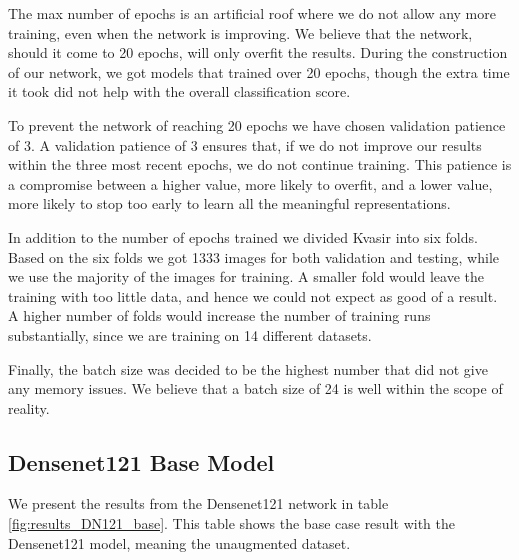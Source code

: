 The max number of epochs is an artificial roof where we do not allow any more training, even when the network is improving.  We believe that the network, should it come to 20 epochs, will only overfit the results. During the construction of our network, we got models that trained over 20 epochs, though the extra time it took did not help with the overall classification score.

To prevent the network of reaching 20 epochs we have chosen validation patience of 3. A validation patience of 3 ensures that, if we do not improve our results within the three most recent epochs, we do not continue training.  This patience is a compromise between a higher value, more likely to overfit, and a lower value, more likely to stop too early to learn all the meaningful representations. 

In addition to the number of epochs trained we divided Kvasir into six folds. Based on the six folds we got 1333 images for both validation and testing, while we use the majority of the images for training. A smaller fold would leave the training with too little data, and hence we could not expect as good of a result. A higher number of folds would increase the number of training runs substantially, since we are training on 14 different datasets.

Finally, the batch size was decided to be the highest number that did not give any memory issues.  We believe that a batch size of 24 is well within the scope of reality.
\FloatBarrier
\subsection{Densenet121 Base Model}
We present the results from the Densenet121 network in table \ref{fig:results_DN121_base}.
This table shows the base case result with the Densenet121 model, meaning the unaugmented dataset. 

